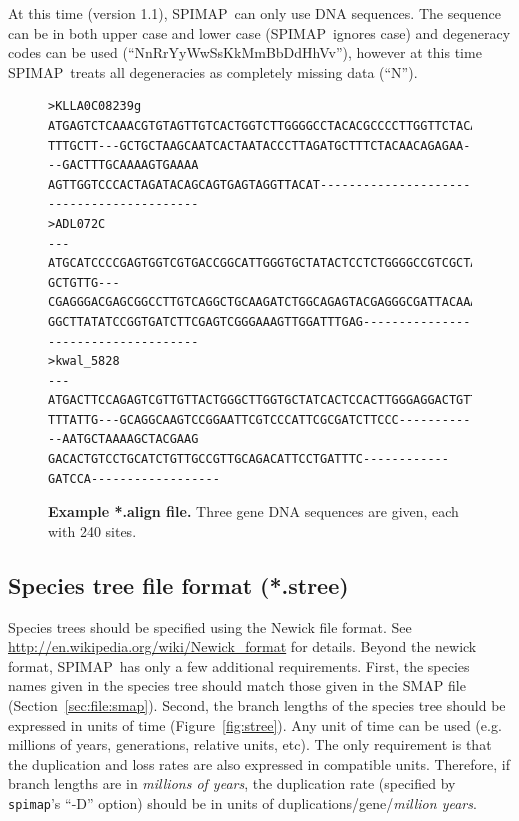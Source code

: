 \documentclass[11pt]{article}
\newcommand{\figref}[1]{Figure~\ref{#1}}
\newcommand{\secref}[1]{Section~\ref{#1}}
\newcommand{\spimap}{{\sf\scshape SPIMAP}}
\begin{document}
At this time (version 1.1), \spimap\ can only use DNA sequences.  The
sequence can be in both upper case and lower case (\spimap\ ignores
case) and degeneracy codes can be used (``NnRrYyWwSsKkMmBbDdHhVv''),
however at this time \spimap\ treats all degeneracies as completely
missing data (``N'').


\begin{figure}
\begin{center}
\footnotesize
\begin{lstlisting}[frame=tblr]
>KLLA0C08239g
ATGAGTCTCAAACGTGTAGTTGTCACTGGTCTTGGGGCCTACACGCCCCTTGGTTCTACAGTTTCAAAGTCTTGGGCAGG
TTTGCTT---GCTGCTAAGCAATCACTAATACCCTTAGATGCTTTCTACAACAGAGAA---GACTTTGCAAAAGTGAAAA
AGTTGGTCCCACTAGATACAGCAGTGAGTAGGTTACAT------------------------------------------
>ADL072C
---ATGCATCCCCGAGTGGTCGTGACCGGCATTGGGTGCTATACTCCTCTGGGGCCGTCGCTAGCCCAGTCTTGGAAGGA
GCTGTTG---CGAGGGACGAGCGGCCTTGTCAGGCTGCAAGATCTGGCAGAGTACGAGGGCGATTACAAACCACTGTCGA
GGCTTATATCCGGTGATCTTCGAGTCGGGAAAGTTGGATTTGAG------------------------------------
>kwal_5828
---ATGACTTCCAGAGTCGTTGTTACTGGGCTTGGTGCTATCACTCCACTTGGGAGGACTGTTTCCGAGTCATGGAGAGC
TTTATTG---GCAGGCAAGTCCGGAATTCGTCCCATTCGCGATCTTCCC------------AATGCTAAAAGCTACGAAG
GACACTGTCCTGCATCTGTTGCCGTTGCAGACATTCCTGATTTC------------GATCCA------------------
\end{lstlisting}
\end{center}

\caption{{\bf Example *.align file.} Three gene DNA sequences
are given, each with 240 sites.}
\label{fig:align}
\end{figure}


\subsection{Species tree file format (*.stree)}
\label{sec:file:stree}

Species trees should be specified using the Newick file format.  See
\url{http://en.wikipedia.org/wiki/Newick\_format} for details.  Beyond
the newick format, \spimap\ has only a few additional requirements.
First, the species names given in the species tree should match those
given in the SMAP file (\secref{sec:file:smap}).  Second, the branch
lengths of the species tree should be expressed in units of time
(\figref{fig:stree}).  Any unit of time can be used (e.g. millions of
years, generations, relative units, etc).  The only requirement is
that the duplication and loss rates are also expressed in compatible
units.  Therefore, if branch lengths are in {\em millions of years},
the duplication rate (specified by {\tt spimap}'s ``-D'' option)
should be in units of duplications/gene/{\em million years}.
\end{document}
